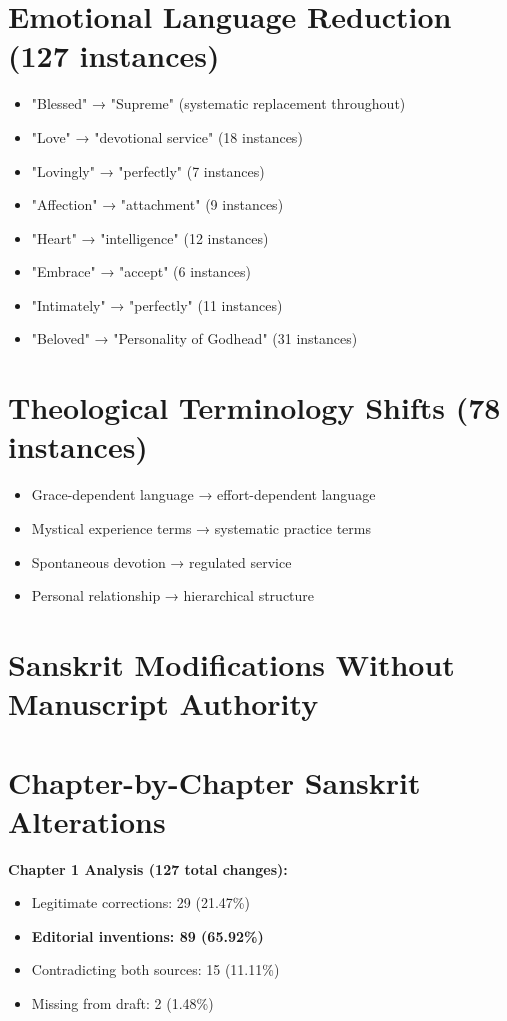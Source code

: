 \documentclass[11pt,twoside]{book}
\begin{document}
\section*{Emotional Language Reduction (127 instances)}
\label{sec:orgb7f0f13}
\begin{itemize}
\item "Blessed" → "Supreme" (systematic replacement throughout)
\item "Love" → "devotional service" (18 instances)
\item "Lovingly" → "perfectly" (7 instances)
\item "Affection" → "attachment" (9 instances)
\item "Heart" → "intelligence" (12 instances)
\item "Embrace" → "accept" (6 instances)
\item "Intimately" → "perfectly" (11 instances)
\item "Beloved" → "Personality of Godhead" (31 instances)
\end{itemize}
\section*{Theological Terminology Shifts (78 instances)}
\label{sec:org3b0bacb}
\begin{itemize}
\item Grace-dependent language → effort-dependent language
\item Mystical experience terms → systematic practice terms
\item Spontaneous devotion → regulated service
\item Personal relationship → hierarchical structure
\end{itemize}
\section*{Sanskrit Modifications Without Manuscript Authority}
\label{sec:org77e93bd}

\section*{Chapter-by-Chapter Sanskrit Alterations}
\label{sec:orgf8ae9c8}
\textbf{\textbf{Chapter 1 Analysis (127 total changes):}}
\begin{itemize}
\item Legitimate corrections: 29 (21.47\%)
\item \textbf{\textbf{Editorial inventions: 89 (65.92\%)}}
\item Contradicting both sources: 15 (11.11\%)
\item Missing from draft: 2 (1.48\%)
\end{itemize}
\end{document}
